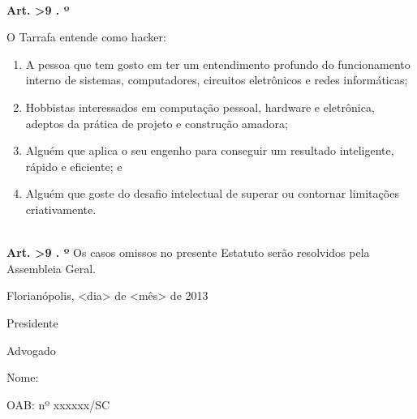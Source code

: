 \documentclass[a4paper]{report}
\newcounter{artigo}[chapter]
\newcommand{\artigo}{%
    \stepcounter{artigo}%
    \hfill \\
    \textbf{
    Art. \theartigo
    \ifnum \theartigo>9
        .
    \else
        º
    \fi
    }
}
\begin{document}
\artigo %

O Tarrafa entende como hacker:
\begin{enumerate}
 \item A pessoa que tem gosto em ter um entendimento profundo do funcionamento
       interno de sistemas, computadores, circuitos eletrônicos e redes
       informáticas;
 \item Hobbistas interessados em computação pessoal, hardware e eletrônica,
       adeptos da prática de projeto e construção amadora;
 \item Alguém que aplica o seu engenho para conseguir um resultado
       inteligente, rápido e eficiente; e
 \item Alguém que goste do desafio intelectual de superar ou contornar
       limitações criativamente.
\end{enumerate}

\artigo %
Os casos omissos no presente Estatuto serão resolvidos pela Assembleia Geral.

Florianópolis, <dia> de <mês> de 2013




                            Presidente




                            Advogado

            Nome:

            OAB: nº xxxxxx/SC
\end{document}
